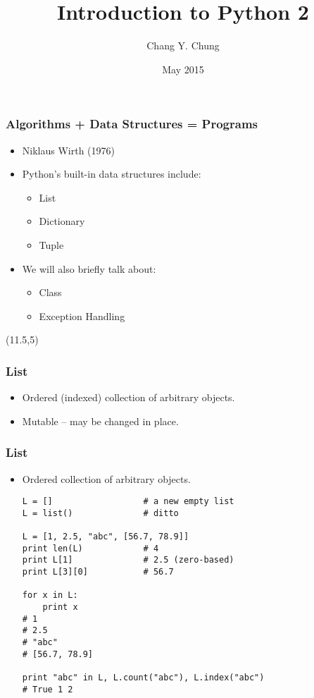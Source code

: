 \documentclass{beamer}
\begin{document}
\title{Introduction to Python 2}
\date{May 2015}
\author{Chang Y. Chung}

{
\begin{frame}[noframenumbering]
\titlepage
\end{frame}}

\begin{frame}[fragile]
\frametitle{Algorithms + Data Structures = Programs}
\begin{itemize}
\item<1-> Niklaus Wirth (1976)\cite{Wirth1976}
\item<2-> Python's built-in data structures include:
\begin{itemize}
  \item List
  \item Dictionary
  \item Tuple
\end{itemize}
\item<3-> We will also briefly talk about:
\begin{itemize}
  \item Class
  \item Exception Handling
\end{itemize}
\end{itemize}

\begin{textblock}{5}(11.5,5)
\end{textblock}
\end{frame}

\begin{frame}[fragile]
\frametitle{List}
\begin{itemize}
\item Ordered (indexed) collection of arbitrary objects.
\item Mutable -- may be changed in place.
\end{itemize}
\end{frame}

\begin{frame}[fragile]
\frametitle{List}
\begin{itemize}
\item Ordered collection of arbitrary objects.
\begin{lstlisting}[escapechar=\%]
L = []                  # a new empty list
L = list()              # ditto

L = [1, 2.5, "abc", [56.7, 78.9]]
print len(L)            # 4
print L[1]              # 2.5 (zero-based)
print L[3][0]           # 56.7

for x in L:
    print x
# 1
# 2.5
# "abc"
# [56.7, 78.9]

print "abc" in L, L.count("abc"), L.index("abc")
# True 1 2
\end{lstlisting}
\end{itemize}
\end{frame}
\end{document}
